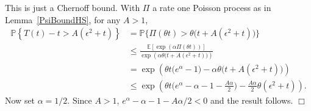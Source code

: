 \documentclass[12pt]{article}
\newenvironment {proof}{{\noindent\bf Proof }}{\hfill $\Box$ \medskip}
\newcommand{\IP}{\mathbb P}
\newcommand{\IE}{\mathbb E}
\numberwithin{equation}{section}
\begin{document}
\begin{proof}
    This is just a Chernoff bound. With $\Pi$ a rate one Poisson process as
	in Lemma~\ref{PsiBoundHS}, for any $A>1$,
	\begin{align*}
        \IP\left\{
            T(t) - t > A(\epsilon^2 + t)
        \right\}
&=
        \IP\Big\{
            \Pi(\theta t)
            >
		\theta\Big( t + A(\epsilon^2 + t)\Big)
        \Big\} \\
&\leq\frac{\IE\left[\exp\left(\alpha\Pi(\theta t)\right)\right]}
		{\exp\left(\alpha\theta\big(t+A(\epsilon^2+t)\big)\right)}
		\\
		&=\exp\left(\theta t\big(e^\alpha-1\big)-\alpha\theta\big(t+A(\epsilon^2+t)\big)\right)
		\\
		&\leq
		\exp\left(\theta t\big(e^\alpha-\alpha-1-\frac{A\alpha}{2}\big)
		-\frac{A\alpha}{2}\theta(\epsilon^2+t)\right).
    \end{align*}
	Now set $\alpha=1/2$. Since $A>1$, $e^\alpha-\alpha-1-A\alpha/2<0$ and the 
	result follows.
\end{proof}
\end{document}
